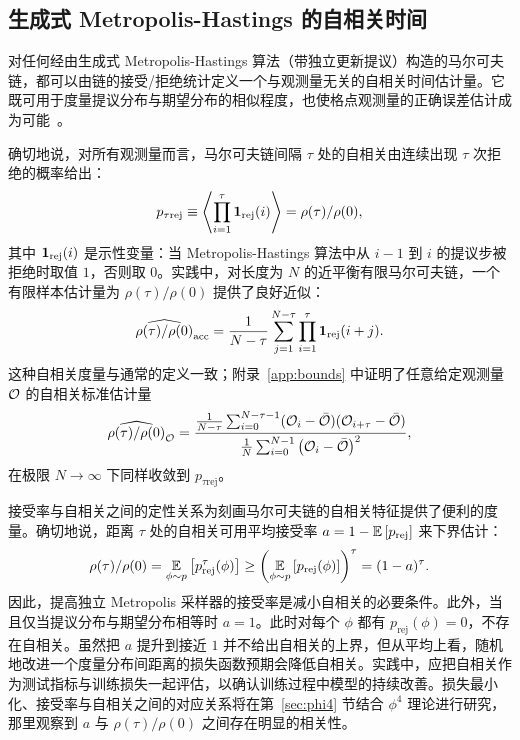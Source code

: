\subsection{生成式 Metropolis-Hastings 的自相关时间}
\label{subsec:autocorr}

对任何经由生成式 Metropolis-Hastings 算法（带独立更新提议）构造的马尔可夫链，都可以由链的接受/拒绝统计定义一个与观测量无关的自相关时间估计量。它既可用于度量提议分布与期望分布的相似程度，也使格点观测量的正确误差估计成为可能~\cite{Wolff2003}。

确切地说，对所有观测量而言，马尔可夫链间隔 $\tau$ 处的自相关由连续出现 $\tau$ 次拒绝的概率给出：
%
\begin{equation}
p_{\tau\text{rej}} \equiv \avg{\prod_{i = 1}^\tau \mathbbm{1}_{\text{rej}}(i)} = \rho(\tau)/\rho(0),
\end{equation}
%
其中 $\mathbbm{1}_{\text{rej}}(i)$ 是示性变量：当 Metropolis-Hastings 算法中从 $i-1$ 到 $i$ 的提议步被拒绝时取值 $1$，否则取 $0$。实践中，对长度为 $N$ 的近平衡有限马尔可夫链，一个有限样本估计量为 $\rho(\tau)/\rho(0)$ 提供了良好近似：
%
\begin{equation}
\widehat{\rho(\tau)/\rho(0)}_{\text{acc}} = \frac{1}{N-\tau} \sum_{j=1}^{N-\tau} \prod_{i = 1}^\tau \mathbbm{1}_{\text{rej}}(i+j).
\end{equation}
%
这种自相关度量与通常的定义一致；附录~\ref{app:bounds} 中证明了任意给定观测量 $\obs$ 的自相关标准估计量
%
\begin{equation}
\widehat{\rho(\tau)/\rho(0)}_\obs
=  \frac{\frac{1}{N-\tau} \sum_{i=0}^{N-\tau-1} (\obs_i - \bar{\obs})(\obs_{i+\tau}-\bar{\obs})}{\frac{1}{N} \sum_{i=0}^{N-1} \paren{\obs_i - \bar{\obs}}^2},
\end{equation}
%
在极限 $N\rightarrow \infty$ 下同样收敛到 $p_{\tau\text{rej}}$。

接受率与自相关之间的定性关系为刻画马尔可夫链的自相关特征提供了便利的度量。确切地说，距离 $\tau$ 处的自相关可用平均接受率 $a = 1 - \mathbb{E}\sq{p_\text{rej}}$ 来下界估计：
\begin{equation}
\rho(\tau)/\rho(0) = \expt{\phi \sim p}\sq{p_{\text{rej}}^\tau(\phi)} \geq \paren{\expt{\phi \sim p}\sq{p_{\text{rej}}(\phi)}}^\tau = (1-a)^\tau.
\label{eq:mean-acc-bound}
\end{equation}
因此，提高独立 Metropolis 采样器的接受率是减小自相关的必要条件。此外，当且仅当提议分布与期望分布相等时 $a = 1$。此时对每个 $\phi$ 都有 $p_\text{rej}(\phi) = 0$，不存在自相关。虽然把 $a$ 提升到接近 $1$ 并不给出自相关的上界，但从平均上看，随机地改进一个度量分布间距离的损失函数预期会降低自相关。实践中，应把自相关作为测试指标与训练损失一起评估，以确认训练过程中模型的持续改善。损失最小化、接受率与自相关之间的对应关系将在第~\ref{sec:phi4} 节结合 $\phi^4$ 理论进行研究，那里观察到 $a$ 与 $\rho(\tau)/\rho(0)$ 之间存在明显的相关性。

